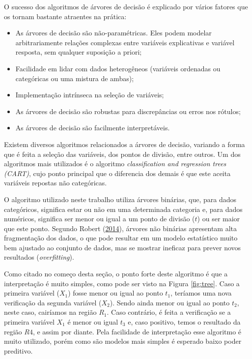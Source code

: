 \documentclass[
	12pt,				%
	a4paper,		%
	oneside,    %
	chapter=TITLE,		   %
	section=TITLE,		   %
	subsection=TITLE,	   %
	subsubsection=TITLE, %
	english,			%
	french,				%
	spanish,			%
	brazil,				%
]{abntex2}
\providecommand{\tightlist}{%
	\setlength{\itemsep}{0pt}\setlength{\parskip}{0pt}}
\begin{document}
O sucesso dos algoritmos de árvores de decisão é explicado por vários
fatores que os tornam bastante atraentes na prática:

\begin{itemize}
\tightlist
\item
  As árvores de decisão são não-paramétricas. Eles podem modelar
  arbitrariamente relações complexas entre variáveis explicativas e
  variável resposta, sem qualquer suposição a priori;
\item
  Facilidade em lidar com dados heterogêneos (variáveis ordenadas ou
  categóricas ou uma mistura de ambas);
\item
  Implementação intrínseca na seleção de variáveis;
\item
  As árvores de decisão são robustas para discrepâncias ou erros nos
  rótulos;
\item
  As árvores de decisão são facilmente interpretáveis.
\end{itemize}

Existem diversos algoritmos relacionados a árvores de decisão, variando
a forma que é feita a seleção das variáveis, dos pontos de divisão,
entre outros. Um dos algoritmos mais utilizados é o algoritmo
\emph{classification and regression trees (CART)}, cujo ponto principal
que o diferencia dos demais é que este aceita variáveis repostas não
categóricas.

O algoritmo utilizado neste trabalho utiliza árvores binárias, que, para
dados categóricos, significa estar ou não em uma determinada categoria
e, para dados numéricos, significa ser menor ou igual a um ponto de
divisão (\(t\)) ou ser maior que este ponto. Segundo Robert
(\protect\hyperlink{ref-robert2014machine}{2014}), árvores não binárias
apresentam alta fragmentação dos dados, o que pode resultar em um modelo
estatístico muito bem ajustado ao conjunto de dados, mas se mostrar
ineficaz para prever novos resultados (\emph{overfitting}).

Como citado no começo desta seção, o ponto forte deste algoritmo é que a
interpretação é muito simples, como pode ser visto na Figura
\ref{fig:tree}. Caso a primeira variável (\(X_1\)) fosse menor ou igual
ao ponto \(t_1\), teríamos uma nova verificação da segunda variável
(\(X_2\)). Sendo ainda menor ou igual ao ponto \(t_2\), neste caso,
cairíamos na região \(R_1\). Caso contrário, é feita a verificação se a
primeira variável \(X_1\) é menor ou igual \(t_3\) e, caso positivo,
temos o resultado da região \(R4\), e assim por diante. Pela facilidade
de interpretação esse algoritmo é muito utilizado, porém como são
modelos mais simples é esperado baixo poder preditivo.
\end{document}

